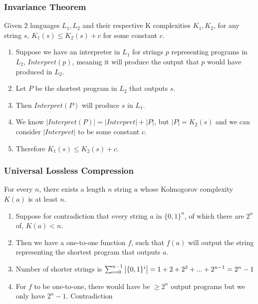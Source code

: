 \documentclass[aspectratio=169]{beamer}
\begin{document}
\begin{frame}
  \frametitle{Invariance Theorem}
  \begin{thrm}
    Given $2$ languages $L_1, L_2$ and their respective K complexities $K_1, K_2$, for any string $s$, $K_1(s) \leq K_2(s) + c$ for some constant $c$.
  \end{thrm}
  \pause
  \begin{pf}
    \begin{enumerate}
        \item Suppose we have an interpreter in $L_1$ for strings $p$ representing programs in $L_2$, $Interpret(p)$, meaning it will produce the output that $p$ would have produced in $L_2$. \pause
        \item Let $P$ be the shortest program in $L_2$ that outputs $s$. \pause
        \item Then $Interpret(P)$ will produce $s$ in $L_1$. \pause
        \item We know $|Interpret(P)| = |Interpret| + |P|$, but $|P| = K_2(s)$ and we can consider $|Interpret|$ to be some constant $c$. \pause
        \item Therefore $K_1(s) \leq K_2(s) + c$.
    \end{enumerate}
  \end{pf}
\end{frame}

\begin{frame}
  \frametitle{Universal Lossless Compression}
  \begin{thrm}
    For every $n$, there exists a length $n$ string $a$ whose Kolmogorov complexity $K(a)$ is at least $n$.
  \end{thrm}
  \pause
  \begin{pf}
    \begin{enumerate}
        \item Suppose for contradiction that every string $a$ in $\{0, 1\}^n$, of which there are $2^n$ of, $K(a) < n$. \pause
        \item Then we have a one-to-one function $f$, such that $f(a)$ will output the string representing the shortest program that outputs $a$. \pause
        \item Number of shorter strings is 
        $\sum_{i=0}^{n-1}\abs{\{0,1\}^i} = 1 + 2 + 2^2 + ... + 2^{n-1} = 2^n-1$ \pause
        \item For $f$ to be one-to-one, there would have be $\geq 2^n$ output programs but we only have $2^n - 1$. Contradiction
    \end{enumerate}
  \end{pf}
\end{frame}
\end{document}

